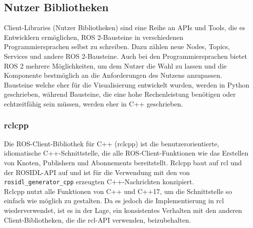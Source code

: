\subsection{Nutzer Bibliotheken}\label{subsec:ROS2NutzerBibliotheken}
Client-Libraries (Nutzer Bibliotheken) sind eine Reihe an \ac{API}s und Tools, die es Entwicklern ermöglichen, \ac{ROS} 2-Bausteine in verschiedenen Programmiersprachen selbst zu schreiben. Dazu zählen neue Nodes, Topics, Services und andere \ac{ROS} 2-Bausteine. Auch bei den Programmiersprachen bietet \ac{ROS} 2 mehrere Möglichkeiten, um dem Nutzer die Wahl zu lassen und die Komponente bestmöglich an die Anforderungen des Nutzens anzupassen. Bausteine welche eher für die Visualisierung entwickelt wurden, werden in Python geschrieben, während Bausteine, die eine hohe Rechenleistung benötigen oder echtzeitfähig sein müssen, werden eher in C++ geschrieben.\\

\subsubsection{rclcpp}\label{subsubsec:ROS2rclcpp}
Die \ac{ROS}-Client-Bibliothek für C++ (rclcpp) ist die benutzerorientierte, idiomatische C++-Schnittstelle, die alle \ac{ROS}-Client-Funktionen wie das Erstellen von Knoten, Publishern und Abonnements bereitstellt. Rclcpp baut auf \ac{rcl} und der \ac{ROS}\ac{IDL}-\ac{API} auf und ist für die Verwendung mit den von \texttt{rosidl\_generator\_cpp} erzeugten C++-Nachrichten konzipiert.\\
Rclcpp nutzt alle Funktionen von C++ und C++17, um die Schnittstelle so einfach wie möglich zu gestalten. Da es jedoch die Implementierung in \ac{rcl} wiederverwendet, ist es in der Lage, ein konsistentes Verhalten mit den anderen Client-Bibliotheken, die die \ac{rcl}-\ac{API} verwenden, beizubehalten.\\

